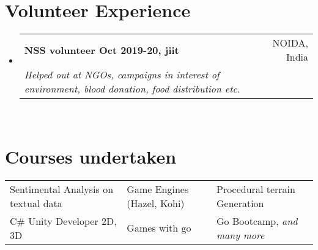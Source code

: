 \documentclass[a4paper,10pt]{article}
\makeatletter
\newcommand{\resumeSubheading}[4]{
  \vspace{-1pt}\item
    \begin{tabular*}{0.97\textwidth}{l@{\extracolsep{\fill}}r}
      \textbf{#1} & #2 \\
      \textit{#3} & \textit{#4} \\
    \end{tabular*}\vspace{-5pt}
}
\newcommand{\resumeSubHeadingListStart}{\begin{itemize}[leftmargin=*]}
\newcommand{\resumeSubHeadingListEnd}{\end{itemize}}
\makeatother
\begin{document}
\section{Volunteer Experience}
  \resumeSubHeadingListStart
    \resumeSubheading
        {NSS volunteer Oct 2019-20, jiit}{NOIDA, India}
        {Helped out at NGOs, campaigns in interest of environment, blood donation, food distribution etc. }{} \\
  \resumeSubHeadingListEnd
\vspace{-6pt}
\section{Courses undertaken}
\begin{tabular}{p{}p{}p{}}
    {Sentimental Analysis on textual data}&{Game Engines (Hazel, Kohi)}&{Procedural terrain Generation}\\
    {C\# Unity Developer 2D, 3D}&{Games with go}&{Go Bootcamp, \textit{and many more}}\\
\end{tabular}
\end{document}
